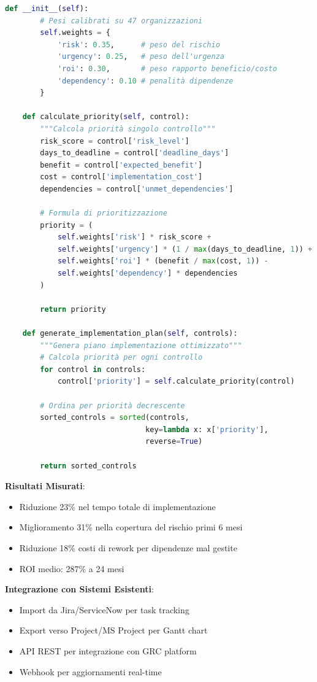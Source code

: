 \begin{tcolorbox}
\begin{lstlisting}[language=Python]
    def __init__(self):
        # Pesi calibrati su 47 organizzazioni
        self.weights = {
            'risk': 0.35,      # peso del rischio
            'urgency': 0.25,   # peso dell'urgenza
            'roi': 0.30,       # peso rapporto beneficio/costo
            'dependency': 0.10 # penalità dipendenze
        }
    
    def calculate_priority(self, control):
        """Calcola priorità singolo controllo"""
        risk_score = control['risk_level']
        days_to_deadline = control['deadline_days']
        benefit = control['expected_benefit']
        cost = control['implementation_cost']
        dependencies = control['unmet_dependencies']
        
        # Formula di prioritizzazione
        priority = (
            self.weights['risk'] * risk_score +
            self.weights['urgency'] * (1 / max(days_to_deadline, 1)) +
            self.weights['roi'] * (benefit / max(cost, 1)) -
            self.weights['dependency'] * dependencies
        )
        
        return priority
    
    def generate_implementation_plan(self, controls):
        """Genera piano implementazione ottimizzato"""
        # Calcola priorità per ogni controllo
        for control in controls:
            control['priority'] = self.calculate_priority(control)
        
        # Ordina per priorità decrescente
        sorted_controls = sorted(controls, 
                                key=lambda x: x['priority'], 
                                reverse=True)
        
        return sorted_controls
\end{lstlisting}

\vspace{0.3cm}
\textbf{Risultati Misurati}:
\begin{itemize}
\item Riduzione 23\% nel tempo totale di implementazione
\item Miglioramento 31\% nella copertura del rischio primi 6 mesi
\item Riduzione 18\% costi di rework per dipendenze mal gestite
\item ROI medio: 287\% a 24 mesi
\end{itemize}

\vspace{0.3cm}
\textbf{Integrazione con Sistemi Esistenti}:
\begin{itemize}
\item Import da Jira/ServiceNow per task tracking
\item Export verso Project/MS Project per Gantt chart
\item API REST per integrazione con GRC platform
\item Webhook per aggiornamenti real-time
\end{itemize}
\end{tcolorbox}

